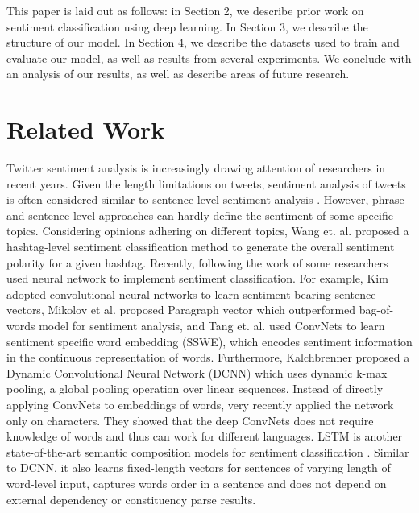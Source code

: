 \documentclass{article} %
\begin{document}
This paper is laid out as follows: in Section 2, we describe prior work on sentiment classification using deep learning. In Section 3, we describe the structure of our model. In Section 4, we describe the datasets used to train and evaluate our model, as well as results from several experiments. We conclude with an analysis of our results, as well as describe areas of future research.


\section{Related Work}
Twitter sentiment analysis is increasingly drawing attention of researchers in recent years. 
Given the length limitations on tweets, sentiment analysis of tweets is often considered similar to sentence-level sentiment analysis \cite{kouloumpis2011twitter}.
However, phrase and sentence level approaches can hardly define the sentiment of some specific topics. Considering opinions adhering on different topics, Wang et. al. \cite{wang2011topic} proposed a hashtag-level sentiment classification method  to generate the overall sentiment polarity for a given hashtag.
Recently, following the work of \cite{mikolov2013efficient} some researchers used neural network to implement sentiment classification. 
For example, Kim \cite{kim2014convolutional} adopted convolutional neural networks to learn sentiment-bearing sentence vectors, Mikolov et al. \cite{mikolov2013distributed} proposed Paragraph vector which outperformed bag-of-words model for sentiment analysis, and Tang et. al. \cite{tang2014learning} used ConvNets to learn sentiment specific word embedding (SSWE), which encodes sentiment information in the continuous
representation of words.
Furthermore, Kalchbrenner \cite{kalchbrenner2014convolutional} proposed a Dynamic Convolutional Neural Network (DCNN) which uses dynamic k-max pooling, a global pooling operation over linear sequences.
Instead of directly applying ConvNets to embeddings of words, very recently \cite{zhang2015character} applied the network only on characters. They showed that the deep ConvNets does not require knowledge of words and thus can work for different languages.
LSTM \cite{hochreiter1997long} is another state-of-the-art semantic composition models for sentiment classification \cite{li2015tree}. Similar to DCNN, it also learns fixed-length vectors for sentences of varying length of word-level input, captures words order in a sentence and does not depend on external dependency or constituency parse results.
\end{document}
